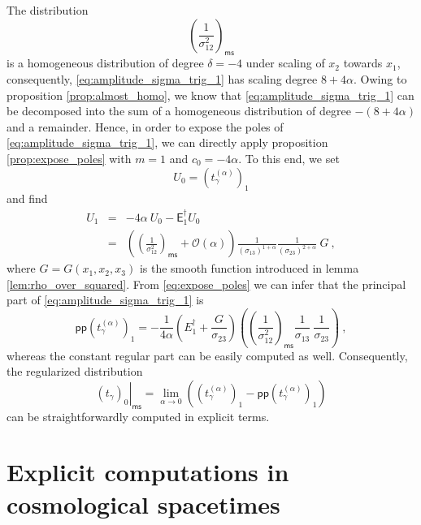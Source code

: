 \documentclass[11pt]{book}
\newcommand{\pp}{\mathsf{pp}}
\newcommand{\ms}{\mathsf{ms}}
\newcommand{\Ocal}{\mathcal{O}}
\newcommand{\Esf}{\mathsf{E}}
\theoremstyle{break}
\begin{document}
%
The distribution 
%
\begin{equation*}
\left(\frac{1}{\sigma^2_{12}}\right)_\ms 
\end{equation*}
%
is a homogeneous distribution of degree $\delta=-4$ under scaling of $x_2$ towards $x_1$, consequently, \eqref{eq:amplitude_sigma_trig_1} has scaling degree $8+4\alpha$. Owing to proposition \ref{prop:almost_homo}, we know that \eqref{eq:amplitude_sigma_trig_1} can be decomposed into the sum of a homogeneous distribution of degree $-(8+4\alpha)$ and a remainder. Hence, in order to expose the poles of \eqref{eq:amplitude_sigma_trig_1}, we can directly apply proposition \ref{prop:expose_poles} with $m=1$ and $c_0 = -4\alpha$. To this end, we set 
%
\begin{equation*}
U_0 = \left(t_{\gamma}^{(\alpha)}\right)_1
\end{equation*}
%
and find 
%
\begin{eqnarray*}
U_1 &=& -4 \alpha \ U_0 - \Esf^\dagger_1 U_0 \\
&=& \left(\left(\frac{1}{\sigma_{12}^{2}} \right)_\ms + \Ocal(\alpha) \right) \frac{1}{(\sigma_{13})^{1+\alpha}} \frac{1}{(\sigma_{23})^{2+\alpha}} \ G \ ,
\end{eqnarray*}
%
where $G=G(x_1,x_2,x_3)$ is the smooth function introduced in lemma \ref{lem:rho_over_squared}. From \eqref{eq:expose_poles} we can infer that the principal part of \eqref{eq:amplitude_sigma_trig_1} is
%
\begin{equation*}
\pp\left(t_{\gamma}^{(\alpha)}\right)_1 = - \frac{1}{4\alpha} \left(E^\dagger_1 + \frac{G}{\sigma_{23}}\right) \left( \left(\frac{1}{\sigma_{12}^2}\right)_\ms \frac{1}{\sigma_{13}} \ \frac{1}{\sigma_{23}} \right) \ ,
\end{equation*}
%
whereas the constant regular part can be easily computed as well. Consequently, the regularized distribution
%
\begin{equation*}
\left.(t_{\gamma})_0\right|_\ms = \lim_{\alpha\to 0} \left( \left(t_{\gamma}^{(\alpha)}\right)_1 - \pp \left(t_{\gamma}^{(\alpha)}\right)_1 \right)
\end{equation*}
%
can be straightforwardly computed in explicit terms.

\section{Explicit computations in cosmological spacetimes}
\end{document}

